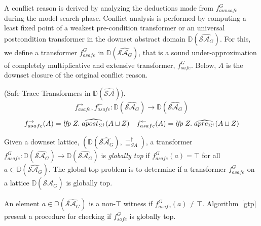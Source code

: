 A conflict reason is derived by analyzing the deductions made 
from $f_{aunsafe}^{G}$ during the model search phase.  
Conflict analysis is performed by computing a
least fixed point of a weakest pre-condition transformer or an universal
postcondition transformer in the downset abstract domain
$\mathbb{D}(\widehat{\mathcal{SA}_{G}})$.  For this, we define
a transformer $f_{asafe}^G$ in $\mathbb{D}(\widehat{\mathcal{SA}_{G}})$, that 
is a sound under-approximation of completely multiplicative and 
extensive transformer, $f_{safe}^{G}$.  Below, $A$ is the downset 
closure of the original conflict reason. 
%
\begin{definition} (Safe Trace Transformers in
  $\mathbb{D}(\widehat{\mathcal{SA}})$). 
  \[
    f_{asafe}^{\rightarrow}, f_{asafe}^{\leftarrow} :
  \mathbb{D}(\widehat{\mathcal{SA}_{G}})
  \rightarrow \mathbb{D}(\widehat{\mathcal{SA}_{G}})
  \]
  \[
    f_{asafe}^{\rightarrow}(A) = \mathit{lfp}\; Z.\;
    \widehat{apost_{\Sigma^\dagger}}(A \sqcup Z)
    \quad
    f_{asafe}^{\leftarrow}(A) = \mathit{lfp}\; Z.\; 
    \widehat{apre_{\Sigma^\dagger}}(A \sqcup Z)
  \] 
\end{definition}
%
%
%
\begin{definition}
Given a downset lattice, 
$(\mathbb{D}(\widehat{\mathcal{SA}_G}), \sqsupseteq_{SA}^\dagger)$, 
a transformer 
$f_{asafe}^{G} : \mathbb{D}(\widehat{\mathcal{SA}_{G}}) \rightarrow \mathbb{D}(\widehat{\mathcal{SA}_{G}})$ 
is \emph{globally top} if $f_{asafe}^G(a) = \top$ for all 
$a \in \mathbb{D}(\widehat{\mathcal{SA}_G})$.  The global top
problem is to determine if a transformer $f_{asafe}^G$ on a lattice 
$\mathbb{D}(\widehat{\mathcal{SA}_{G}})$ is globally top.
\end{definition}
%
An element $a \in \mathbb{D}(\widehat{\mathcal{SA}_{G}})$ is a 
non-$\top$ witness if $f_{asafe}^G(a) \neq \top$.  Algorithm~\ref{gtp} 
present a procedure for checking if $f_{safe}^G$ is globally top.  
